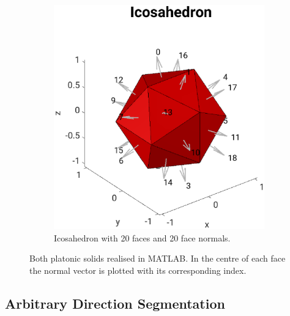 \begin{figure}[H]
\begin{subfigure}[b]{0.47\textwidth}
         \includegraphics[width=1.2\textwidth]{Graphics/Icosahedron.eps}
         \caption{Icosahedron with 20 faces and 20 face normals.}
         \label{fig:Icosahedron_MATLAB}
     \end{subfigure}
        \caption{Both platonic solids realised in MATLAB. In the centre of each face the normal vector is plotted with its corresponding index. }
        \label{fig:platonic_solids_matlab}
\end{figure}


\subsection{Arbitrary Direction Segmentation}
\label{chap:arbitrarySegment}


